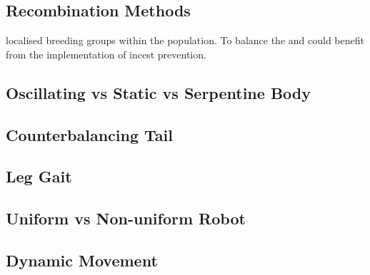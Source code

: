 \documentclass{article}
\begin{document}
\subsection{Recombination Methods}
localised breeding groups within the population. To balance the  and could benefit from the implementation of incest prevention. 

\subsection{Oscillating vs Static vs Serpentine Body}


\subsection{Counterbalancing Tail}

\subsection{Leg Gait}

\subsection{Uniform vs Non-uniform Robot}

\subsection{Dynamic Movement}
\end{document}
